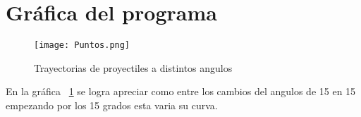 \documentclass{article}
\begin{document}
\section{Gráfica del programa}


\begin{figure}
  \texttt{[image: Puntos.png]}
  \caption{Trayectorias de proyectiles a distintos angulos}
  \label{fig:Figura1}
\end{figure}
En la gráfica ~\ref{fig:Figura1} se logra apreciar como entre los cambios del angulos de 15 en 15 empezando por los 15 grados esta varia su curva.
\end{document}
